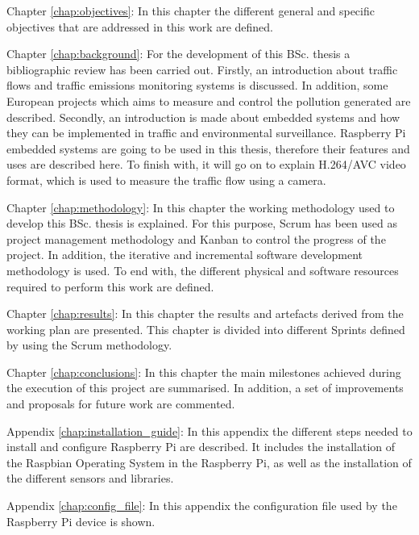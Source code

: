 \begin{definitionlist}
	\item[Chapter \ref{chap:objectives}: \nameref{chap:objectives}] In this chapter the different general and specific objectives that are addressed in this work are defined.
	
	\item[Chapter \ref{chap:background}: \nameref{chap:background}] For the development of this \ac{BSc.} thesis a bibliographic review has been carried out. Firstly, an introduction about traffic flows and traffic emissions monitoring systems is discussed. In addition, some European projects which aims to measure and control the pollution generated are described. Secondly, an introduction is made about embedded systems and how they can be implemented in traffic and environmental surveillance. Raspberry Pi embedded systems are going to be used in this thesis, therefore their features and uses are described here. To finish with, it will go on to explain H.264/AVC video format, which is used to measure the traffic flow using a camera.
	
	\item[Chapter \ref{chap:methodology}: \nameref{chap:methodology}] In this chapter the working methodology used to develop this \ac{BSc.} thesis is explained. For this purpose, Scrum has been used as project management methodology and Kanban to control the progress of the project. In addition, the iterative and incremental software development methodology is used. To end with, the different physical and software resources required to perform this work are defined.
	
	\item[Chapter \ref{chap:results}: \nameref{chap:results}] In this chapter the results and artefacts derived from the working plan are presented. This chapter is divided into different Sprints defined by using the Scrum methodology.
	
	\item[Chapter \ref{chap:conclusions}: \nameref{chap:conclusions}] In this chapter the main milestones achieved during the execution of this project are summarised. In addition, a set of improvements and proposals for future work are commented. 
	
	\item[Appendix \ref{chap:installation_guide}: \nameref{chap:installation_guide}] In this appendix the different steps needed to install and configure Raspberry Pi are described. It includes the installation of the Raspbian Operating System in the Raspberry Pi, as well as the installation of the different sensors and libraries.
	
	\item[Appendix \ref{chap:config_file}: \nameref{chap:config_file}] In this appendix the configuration file used by the Raspberry Pi device is shown.
\end{definitionlist}


